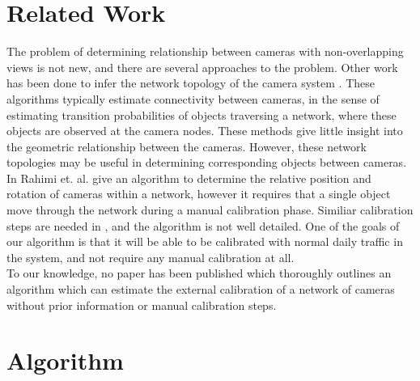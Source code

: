 \documentclass[journal]{IEEEtran}
\begin{document}
\section{Related Work}
	\indent The problem of determining relationship between cameras with non-overlapping views is not new, and there are several approaches to the problem. Other work has been done to infer the network topology of the camera system \cite{ellis2003,makris2004}. These algorithms typically estimate connectivity between cameras, in the sense of estimating transition probabilities of objects traversing a network, where these objects are observed at the camera nodes. These methods give little insight into the geometric relationship between the cameras. However, these network topologies may be useful in determining corresponding objects between cameras. \\
	\indent In \cite{rahimi2004} Rahimi et. al. give an algorithm to determine the relative position and rotation of cameras within a network, however it requires that a single object move through the network during a manual calibration phase. Similiar calibration steps are needed in \cite{knight2003}, and the algorithm is not well detailed. One of the goals of our algorithm is that it will be able to be calibrated with normal daily traffic in the system, and not require any manual calibration at all. \\
	\indent To our knowledge, no paper has been published which thoroughly outlines an algorithm which can estimate the external calibration of a network of cameras without prior information or manual calibration steps.
	
\section{Algorithm}
\end{document}
